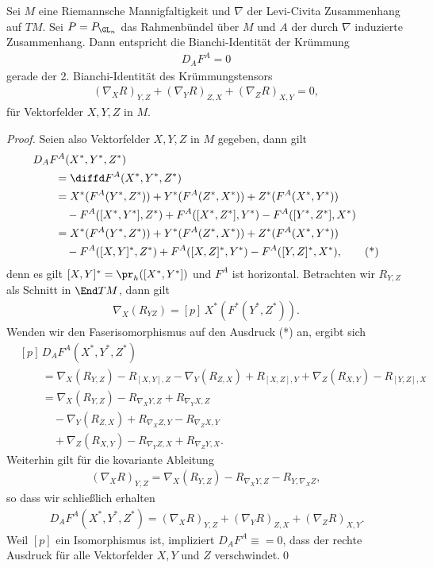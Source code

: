 \documentclass[%
	paper=a5,%
	fleqn,%
	DIV=18,%
	BCOR=0mm,
	fontsize=11pt,
	titlepage=false,%
	bibliography=totoc,
	DIV=18,%
	twoside=true,
	pdftitle=Riemannsche Geometrie,
	pdfauthor=Uwe Semmelmann,
	numbers=noendperiod]%
	{scrbook}
\begin{document}
\begin{lem}
Sei $M$ eine Riemannsche Mannigfaltigkeit und $\nabla$ der Levi-Civita
Zusammenhang auf $TM$. Sei $P=P_{\GL_n}$ das Rahmenbündel über $M$ und $A$ der
durch $\nabla$ induzierte Zusammenhang.
Dann entspricht die Bianchi-Identität der Krümmung
\begin{align*}
D_AF^A = 0
\end{align*}
gerade der 2. Bianchi-Identität des Krümmungstensors
\begin{align*}
(\nabla_X R)_{Y,Z} + 
(\nabla_Y R)_{Z,X}  +
(\nabla_Z R)_{X,Y} = 0,
\end{align*}
für Vektorfelder $X,Y,Z$ in $M$.\fish
\end{lem}
\begin{proof}
Seien also Vektorfelder $X,Y,Z$ in $M$ gegeben, dann gilt
\begin{align*}
&D_A F^A(X^*,Y^*,Z^*)\\
&\qquad= \diffd F^A(X^*,Y^*,Z^*)\\
&\qquad= X^* (F^A(Y^*,Z^*))
+ Y^* (F^A(Z^*,X^*))
+ Z^* (F^A(X^*,Y^*))\\
&\qquad\quad - F^A([X^*,Y^*],Z^*)
+ F^A([X^*,Z^*],Y^*)
- F^A([Y^*,Z^*],X^*)\\
&\qquad= X^* (F^A(Y^*,Z^*))
+ Y^* (F^A(Z^*,X^*))
+ Z^* (F^A(X^*,Y^*))\\
&\qquad\quad - F^A([X,Y]^*,Z^*)
+ F^A([X,Z]^*,Y^*)
- F^A([Y,Z]^*,X^*),\tag{*}
\end{align*}
denn es gilt $[X,Y]^*= \pr_h([X^*,Y^*])$ und  $F^A$ ist horizontal. Betrachten
wir $R_{Y,Z}$ als Schnitt in $\End TM$, dann gilt
\begin{align*}
\nabla_X (R_{YZ}) = [p]\, X^*(F^*(Y^*,Z^*)).
\end{align*} 
Wenden wir den Faserisomorphismus auf den Ausdruck (*) an, ergibt sich
\begin{align*}
&[p]\, D_A F^A(X^*,Y^*,Z^*) \\
&\qquad = 
\nabla_X (R_{Y,Z}) - R_{[X,Y],Z}
- \nabla_Y (R_{Z,X}) + R_{[X,Z],Y}
+ \nabla_Z (R_{X,Y}) - R_{[Y,Z],X}\\
&\qquad = 
\nabla_X (R_{Y,Z}) - R_{\nabla_X Y,Z} + R_{\nabla_Y X,Z}\\
&\qquad\quad - \nabla_Y (R_{Z,X}) + R_{\nabla_X Z,Y} - R_{\nabla_Z X,Y}\\
&\qquad \quad+ \nabla_Z (R_{X,Y}) - R_{\nabla_Y Z,X} + R_{\nabla_Z Y,X}.
\end{align*}
Weiterhin gilt für die kovariante Ableitung
\begin{align*}
(\nabla_X R)_{Y,Z} = \nabla_X (R_{Y,Z}) - R_{\nabla_X Y,Z} - R_{Y,\nabla_X Z},
\end{align*}
so dass wir schließlich erhalten
\begin{align*}
[p]\,D_A F^A(X^*,Y^*,Z^*) = 
(\nabla_X R)_{Y,Z} + (\nabla_Y R)_{Z,X} + (\nabla_Z R)_{X,Y}.
\end{align*}
Weil $[p]$ ein Isomorphismus ist, impliziert $D_A F^A \equiv = 0$, dass der
rechte Ausdruck für alle Vektorfelder $X,Y$ und $Z$ verschwindet.\qed
\end{proof}
\end{document}
